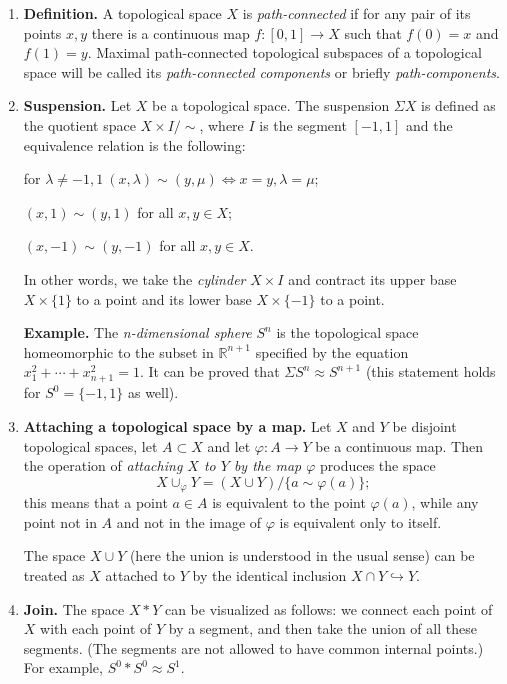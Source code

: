 \documentclass{ctexart}
\begin{document}
\begin{enumerate}
\item \textbf{Definition.} A topological space $X$ is \textit{path-connected} if for any pair of its points $x,y$ there is a continuous map $f : [0,1] \to X$ such that $f(0) = x$ and $f(1) = y$. Maximal path-connected topological subspaces of a topological space will be called its \textit{path-connected components} or briefly \textit{path-components}.

\item \textbf{Suspension.} Let $X$ be a topological space. The suspension $\Sigma X$ is defined as the quotient space $X \times I/\!\!\sim$, where $I$ is the segment $[-1,1]$ and the equivalence relation is the following:
    \begin{adjustwidth}{2em}{}
    for $\lambda \neq -1,1\ (x,\lambda) \sim (y,\mu) \Longleftrightarrow x = y, \lambda = \mu$;

    $(x,1) \sim (y,1)$ for all $x,y \in X$;

    $(x,-1) \sim (y,-1)$ for all $x,y \in X$.
    \end{adjustwidth}

In other words, we take the \textit{cylinder} $X \times I$ and contract its upper base $X \times \{1\}$ to a point and its lower base $X \times \{-1\}$ to a point.

\textbf{Example.} The \textit{n-dimensional sphere} $S^n$ is the topological space homeomorphic to the subset in $\mathbb{R}^{n+1}$ specified by the equation $x_1^2 + \cdots + x_{n+1}^2 = 1$. It can be proved that $\Sigma S^n \approx S^{n+1}$ (this statement holds for $S^0 = \{-1,1\}$ as well).

\item \textbf{Attaching a topological space by a map.} Let $X$ and $Y$ be disjoint topological spaces, let $A \subset X$ and let $\varphi : A \to Y$ be a continuous map. Then the operation of \textit{attaching $X$ to $Y$ by the map $\varphi$} produces the space
    \[
    X \cup_\varphi Y = (X \cup Y) / \{ a \sim \varphi(a) \};
    \]
this means that a point $a \in A$ is equivalent to the point $\varphi(a)$, while any point not in $A$ and not in the image of $\varphi$ is equivalent only to itself.

The space $X \cup Y$ (here the union is understood in the usual sense) can be treated as $X$ attached to $Y$ by the identical inclusion $X \cap Y \hookrightarrow Y$.

\item \textbf{Join.} The space $X * Y$ can be visualized as follows: we connect each point of $X$ with each point of $Y$ by a segment, and then take the union of all these segments. (The segments are not allowed to have common internal points.) For example, $S^0 * S^0 \approx S^1$.


\end{enumerate}
\end{document}

